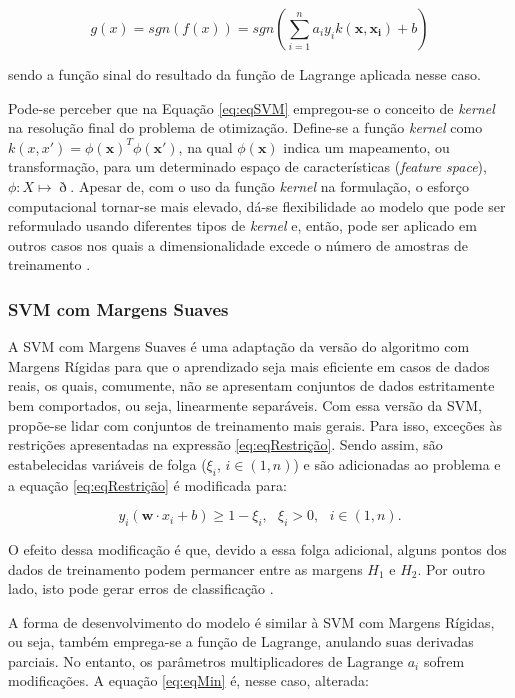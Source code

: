 \begin{equation}
\label{eq:eqSVM}
  g(x) = sgn(f(x)) = sgn\left(\displaystyle\sum_{i=1}^{n}a_iy_ik(\boldsymbol{x},\boldsymbol{x_i})+b\right)
\end{equation}

sendo a função sinal do resultado da função de Lagrange aplicada nesse caso.

Pode-se perceber que na Equação \ref{eq:eqSVM} empregou-se o conceito de \textit{kernel} na resolução final do problema de otimização. Define-se a função \textit{kernel} como $k(x,x') = \phi(\boldsymbol{x})^T\phi(\boldsymbol{x'})$, na qual $\phi(\boldsymbol{x})$ indica um mapeamento, ou transformação, para um determinado espaço de características (\textit{feature space}), $\phi:X\mapsto\eth$. Apesar de, com o uso da função \textit{kernel} na formulação, o esforço computacional tornar-se mais elevado, dá-se flexibilidade ao modelo que pode ser reformulado usando diferentes tipos de \textit{kernel} e, então, pode ser aplicado em outros casos nos quais a dimensionalidade excede o número de amostras de treinamento .

\subsubsection{SVM com Margens Suaves}

A SVM com Margens Suaves é uma adaptação da versão do algoritmo com Margens Rígidas para que o aprendizado seja mais eficiente em casos de dados reais, os quais, comumente, não se apresentam conjuntos de dados estritamente bem comportados, ou seja, linearmente separáveis. Com essa versão da SVM, propõe-se lidar com conjuntos de treinamento mais gerais. Para isso, exceções às restrições apresentadas na expressão \ref{eq:eqRestrição}. Sendo assim, são estabelecidas variáveis de folga ($\xi_i$, $i \in (1,n)$) e são adicionadas ao problema e a equação \ref{eq:eqRestrição} é modificada para:

\begin{equation}
\label{eq:eqSuave}
 y_i(\boldsymbol{w} \cdot x_i + b) \geq 1 - \xi_i, \text{ } \xi_i > 0, \text{ } i \in (1,n).
\end{equation}

O efeito dessa modificação é que, devido a essa folga adicional, alguns pontos dos dados de treinamento podem permancer entre as margens $H_1$ e $H_2$. Por outro lado, isto pode gerar erros de classificação .

A forma de desenvolvimento do modelo é similar à SVM com Margens Rígidas, ou seja, também emprega-se a função de Lagrange, anulando suas derivadas parciais. No entanto, os parâmetros multiplicadores de Lagrange $a_i$ sofrem modificações. A equação \ref{eq:eqMin} é, nesse caso, alterada:

